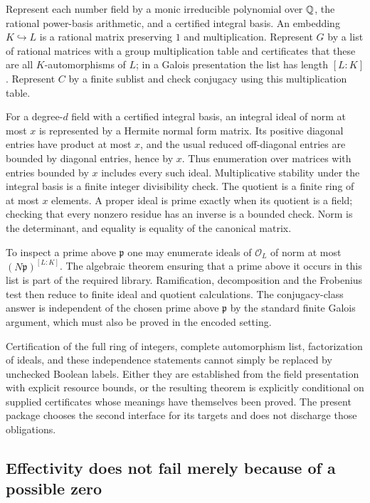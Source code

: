 Represent each number field by a monic irreducible polynomial over $\mathbb Q$,
the rational power-basis arithmetic, and a certified integral basis. An
embedding $K\hookrightarrow L$ is a rational matrix preserving $1$ and
multiplication. Represent $G$ by a list of rational matrices with a group
multiplication table and certificates that these are all $K$-automorphisms
of $L$; in a Galois presentation the list has length $[L:K]$. Represent $C$
by a finite sublist and check conjugacy using this multiplication table.

For a degree-$d$ field with a certified integral basis, an integral ideal
of norm at most $x$ is represented by a Hermite normal form matrix. Its
positive diagonal entries have product at most $x$, and the usual reduced
off-diagonal entries are bounded by diagonal entries, hence by $x$.
Thus enumeration over matrices with entries bounded by $x$ includes every
such ideal. Multiplicative stability under the integral basis is a finite
integer divisibility check. The quotient is a finite ring of at most $x$
elements. A proper ideal is prime exactly when its quotient is a field;
checking that every nonzero residue has an inverse is a bounded check.
Norm is the determinant, and equality is equality of the canonical matrix.

To inspect a prime above $\mathfrak p$ one may enumerate ideals of
$\mathcal O_L$ of norm at most $(N\mathfrak p)^{[L:K]}$. The algebraic
theorem ensuring that a prime above it occurs in this list is part of the
required library. Ramification, decomposition and the Frobenius test then
reduce to finite ideal and quotient calculations. The conjugacy-class
answer is independent of the chosen prime above $\mathfrak p$ by the
standard finite Galois argument, which must also be proved in the encoded
setting.

Certification of the full ring of integers, complete automorphism list,
factorization of ideals, and these independence statements cannot simply
be replaced by unchecked Boolean labels. Either they are established from
the field presentation with explicit resource bounds, or the resulting
theorem is explicitly conditional on supplied certificates whose meanings
have themselves been proved. The present package chooses the second
interface for its targets and does not discharge those obligations.

\subsection{Effectivity does not fail merely because of a possible zero}

